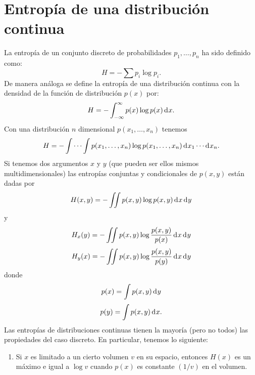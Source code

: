 \section{Entrop\'ia de una distribuci\'on continua}

La entrop\'ia de un conjunto discreto de probabilidades $p_1, \ldots,
p_n$ ha sido definido como:
\begin{equation}
  H = -\sum p_i \log p_i.
\end{equation}
De manera an\'aloga se define la entrop\'ia de una distribuci\'on continua con
la densidad de la funci\'on de distribuci\'{o}n $p(x)$ por:
\begin{equation}
  H = -\int_{-\infty}^{\infty} p(x) \log p(x) \diff x .
\end{equation}
Con una distribuci\'on $n$ dimensional $p(x_1, \ldots, x_n)$ tenemos
\begin{equation}
  H = -\int \cdots \int p(x_1, \ldots, x_n) \log p(x_1, \ldots,
  x_n) \diff x _1 \cdots  \diff x _n.
\end{equation}
Si tenemos dos argumentos $x$ y $y$ (que pueden ser ellos mismos
multidimensionales) las entrop\'ias conjuntas y condicionales de $p(x, y)$
est\'an dadas por
\begin{equation}
  H(x, y) = -\iint p(x, y) \log p(x, y) \diff x  \diff y 
\end{equation}
y
\begin{equation}
  H_x(y) = -\iint p(x, y) \log \frac{p(x, y)}{p(x)}  \diff x  \diff y 
\end{equation}
\begin{equation}
  H_y(x) = -\iint p(x, y) \log \frac{p(x, y)}{p(y)}  \diff x  \diff y 
\end{equation}
donde
\begin{equation}
  p(x) = \int p(x, y) \diff y 
\end{equation}
\begin{equation}
  p(y) = \int p(x, y) \diff x .
\end{equation}
Las entrop\'ias de distribuciones continuas tienen la mayor\'ia (pero
no todos) las propiedades del caso discreto. En particular, tenemos lo
siguiente:
\begin{enumerate}
  \item Si $x$ es limitado a un cierto volumen $v$ en su espacio, entonces
  $H(x)$ es un m\'aximo e igual a $\log v$ cuando $p(x)$ es constante
  $(1/v)$ en el volumen.
\end{enumerate}

